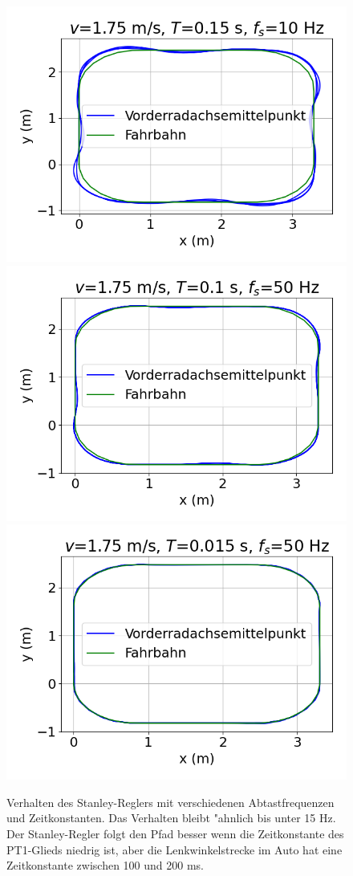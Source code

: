 \documentclass[arbeit=studie,oneside,BCOR=12mm]{ArbeitRST}
\begin{document}
\begin{figure}[h]
    \includegraphics[scale=0.47]{10Hz}
    \includegraphics[scale=0.47]{T100ms}
    \includegraphics[scale=0.47]{T15ms}
    \caption{Verhalten des Stanley-Reglers mit verschiedenen Abtastfrequenzen und Zeitkonstanten.
    Das Verhalten bleibt "ahnlich bis unter 15 Hz. Der Stanley-Regler folgt den Pfad besser
    wenn die Zeitkonstante des PT1-Glieds niedrig ist, aber die Lenkwinkelstrecke im Auto hat eine 
    Zeitkonstante zwischen 100 und 200 ms.}
    \label{sampling}
\end{figure}
\end{document}
